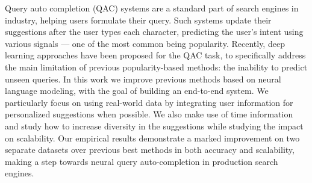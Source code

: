 Query auto completion (QAC) systems are a standard part of search engines in industry, helping users formulate their query. Such systems update their suggestions after the user types each character, predicting the user's intent using various signals --- one of the most common being popularity. Recently, deep learning approaches have been proposed for the QAC task, to specifically address the main limitation of previous popularity-based methods: the inability to predict unseen queries. In this work we improve previous methods based on neural language modeling, with the goal of building an end-to-end system. We particularly focus on using real-world data by integrating user information for personalized suggestions when possible. We also make use of time information and study how to increase diversity in the suggestions while studying the impact on scalability. Our empirical results demonstrate a marked improvement on two separate datasets over previous best methods in both accuracy and scalability, making a step towards neural query auto-completion in production search engines.
